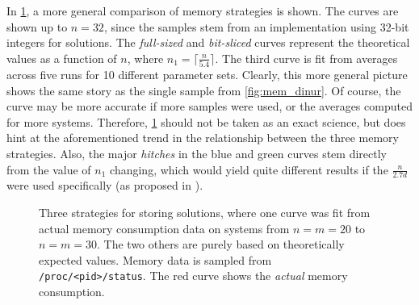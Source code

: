 In \cref{fig:three_mem}, a more general comparison of memory strategies is shown. The curves are shown up to $n = 32$, since the samples stem from an implementation using 32-bit integers for solutions. The \textit{full-sized} and \textit{bit-sliced} curves represent the theoretical values as a function of $n$, where $n_1 = \lceil \frac{n}{5.4} \rceil$. The third curve is fit from averages across five runs for 10 different parameter sets. Clearly, this more general picture shows the same story as the single sample from \cref{fig:mem_dinur}. Of course, the curve may be more accurate if more samples were used, or the averages computed for more systems. Therefore, \cref{fig:three_mem} should not be taken as an exact science, but does hint at the aforementioned trend in the relationship between the three memory strategies. Also, the major \textit{hitches} in the blue and green curves stem directly from the value of $n_1$ changing, which would yield quite different results if the $\frac{n}{2.7d}$ were used specifically (as proposed in \cite{eurocrypt-2021-30841}).

\begin{figure}[t]
    \centering
    \caption{Three strategies for storing solutions, where one curve was fit from actual memory consumption data on systems from $n = m = 20$ to $n = m = 30$. The two others are purely based on theoretically expected values. Memory data is sampled from \texttt{/proc/<pid>/status}. The red curve shows the \textit{actual} memory consumption.} \label{fig:three_mem}
\end{figure}

